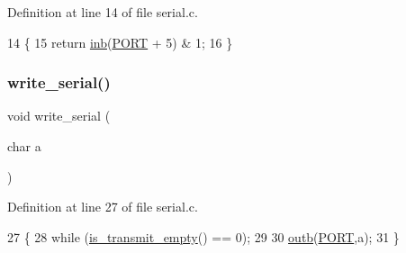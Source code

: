 Definition at line 14 of file serial.\+c.


\begin{DoxyCode}
14                       \{
15    \textcolor{keywordflow}{return} \hyperlink{a00158_a0223c8898dfec29069879dc51076e28a_a0223c8898dfec29069879dc51076e28a}{inb}(\hyperlink{a00050_a614217d263be1fb1a5f76e2ff7be19a2_a614217d263be1fb1a5f76e2ff7be19a2}{PORT} + 5) & 1;
16 \}
\end{DoxyCode}
\mbox{\label{a00050_aac3c84e21fffc4696d8969ca6955bfc8_aac3c84e21fffc4696d8969ca6955bfc8}} 
\subsubsection{\texorpdfstring{write\+\_\+serial()}{write\_serial()}}
{\footnotesize\ttfamily void write\+\_\+serial (\begin{DoxyParamCaption}\item[{char}]{a }\end{DoxyParamCaption})}



Definition at line 27 of file serial.\+c.


\begin{DoxyCode}
27                           \{
28    \textcolor{keywordflow}{while} (\hyperlink{a00050_a01fe5504f7b8f4eee1545737495bae76_a01fe5504f7b8f4eee1545737495bae76}{is\_transmit\_empty}() == 0);
29  
30    \hyperlink{a00158_aa37f5841c54156a4b14fc0d6f626b44f_aa37f5841c54156a4b14fc0d6f626b44f}{outb}(\hyperlink{a00050_a614217d263be1fb1a5f76e2ff7be19a2_a614217d263be1fb1a5f76e2ff7be19a2}{PORT},a);
31 \}
\end{DoxyCode}
